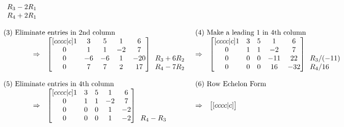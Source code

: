 {\begin{example}
{$$\begin{array}{rlcl}
  \begin{array}{lr} \ \\ \ \\ R_3-2R_1 \\ R_4+2R_1 \end{array}
\\ \\
\multicolumn{2}{l}{\text{(3) Eliminate entries in 2nd column}}&
\multicolumn{2}{l}{\text{(4) Make a leading 1 in 4th column}}\\
\Rightarrow&
\begin{bmatrix}[cccc|c]
  1 & 3 & 5 & 1 & 6 \\
 0 & 1 & 1 & -2 & 7 \\
 0 & -6 & -6 & 1 & -20 \\
 0 & 7 & 7 & 2 & 17
\end{bmatrix}
  \begin{array}{lr} \ \\ \ \\ R_3+6R_2 \\ R_4-7R_2 \end{array}
&\Rightarrow& 
\begin{bmatrix}[cccc|c]
  1 & 3 & 5 & 1 & 6 \\
 0 & 1 & 1 & -2 & 7 \\
 0 & 0 & 0 & -11 & 22 \\
 0 & 0 & 0 & 16 & -32
\end{bmatrix}
  \begin{array}{lr} \ \\ \ \\ R_3/(-11) \\ R_4/16 \end{array}
\\ \\
\multicolumn{2}{l}{\text{(5) Eliminate entries in 4th column}}&
\multicolumn{2}{l}{\text{(6) Row Echelon Form}}\\
\Rightarrow&
\begin{bmatrix}[cccc|c]
  1 & 3 & 5 & 1 & 6 \\
 0 & 1 & 1 & -2 & 7 \\
 0 & 0 & 0 & 1 & -2 \\
 0 & 0 & 0 & 1 & -2
\end{bmatrix}
  \begin{array}{lr} \ \\ \ \\ \ \\ R_4-R_3 \end{array}
&\Rightarrow& 
\begin{bmatrix}[cccc|c]

\end{bmatrix}
\end{array}$$}
\end{example}}

